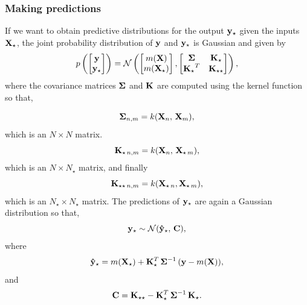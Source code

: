 \subsubsection{Making predictions}
If we want to obtain predictive distributions for the output $\bf y_{\star}$ given the inputs $\bf X_{\star}$,  the joint probability distribution of $\bf y$ and $\bf y_{\star}$ is Gaussian and given by
\begin{equation}
p \left( \begin{bmatrix} {\bf y} \\ {\bf y_{\star}} \end{bmatrix} \right) = \mathcal{N} \left( \begin{bmatrix} m({\bf X}) \\ m({\bf X_{\star}}) \end{bmatrix} , \begin{bmatrix} {\bf \Sigma} & {\bf K_{\star} }\\ {\bf K_{\star}}^{T} & {\bf K_{\star \star}} \end{bmatrix}  \right), 
\end{equation}
where the covariance matrices $\bf \Sigma$ and $\bf K$ are computed using the kernel function so that,

\begin{equation}
{\bf \Sigma}_{n, m} = k({\bf X}_{n}, \, {\bf X}_{m}),
\end{equation}
which is an $N \times N$ matrix.
\begin{equation}
{\bf K}_{\star \, n, m} = k({\bf X}_{n}, \, { \bf X}_{\star \, m}),
\end{equation}
which is an $N \times N_{\star}$ matrix, and finally
\begin{equation}
{\bf K}_{\star \star \, n, m} = k({\bf X}_{\star \, n},  {\bf X}_{\star \,m}),
\end{equation}
which is an $N_{\star} \times N_{\star}$ matrix.
The predictions of $\bf y_{\star}$ are again a Gaussian distribution so that,
\begin{equation}
{\bf y}_{\star} \sim \mathcal{N}(\bf \hat{y}_{\star}, \, \bf C),
\label{eq:pred}
\end{equation}
where 
\begin{equation}
{\bf \hat{y}}_{\star} = m({\bf X}_{\star}) + {\bf K}_{\star}^{T} \, {\bf \Sigma}^{-1} \, ({\bf y} - m(\bf X)),
\end{equation}
and 
\begin{equation}
{\bf C} = {\bf K}_{\star \star} - {\bf K}_{\star}^{T} \, {\bf \Sigma}^{-1} \, {\bf K_{\star}}.
\end{equation}

